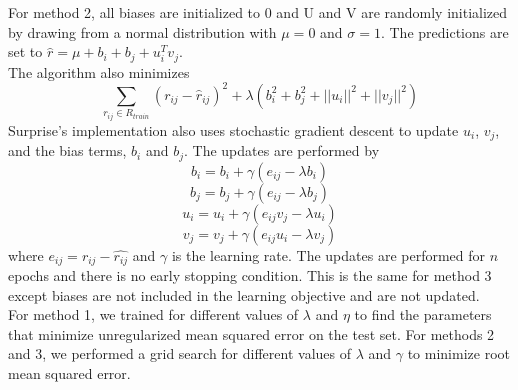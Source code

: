 \documentclass{article}
\begin{document}
For method 2, all biases are initialized to 0 and U and V are randomly initialized by drawing from a normal distribution with $\mu = 0$ and $\sigma = 1$. The predictions are set to $\hat{r} = \mu + b_i + b_j + u_i^{T}v_j$.\\ The algorithm also minimizes $$\sum_{r_{ij} \in R_{train}} (r_{ij} - \hat{r}_{ij})^2 + \lambda (b_i^2 + b_j^2 + ||u_i||^2 + ||v_j||^2)$$ 
Surprise's implementation also uses stochastic gradient descent to update $u_i$, $v_j$, and the bias terms, $b_i$ and $b_j$. The updates are performed by $$b_i = b_i + \gamma(e_{ij} - \lambda b_i)$$
$$b_j = b_j + \gamma(e_{ij} - \lambda b_j)$$
$$u_i = u_i + \gamma(e_{ij} v_j - \lambda u_i)$$
$$v_j = v_j + \gamma(e_{ij} u_i - \lambda v_j)$$
where $e_{ij} = r_{ij} - \hat{r_{ij}}$ and $\gamma$ is the learning rate. The updates are performed for $n$ epochs and there is no early stopping condition. This is the same for method 3 except biases are not included in the learning objective and are not updated. \\

For method 1, we trained for different values of $\lambda$ and $\eta$ to find the parameters that minimize unregularized mean squared error on the test set. For methods 2 and 3, we performed a grid search for different values of $\lambda$ and $\gamma$ to minimize root mean squared error.\\
\end{document}
